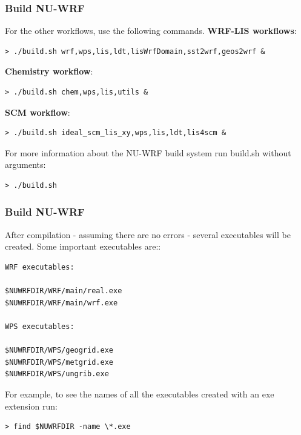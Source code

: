 \begin{frame}[fragile]\frametitle{Build NU-WRF}

\scriptsize{
For the other workflows, use the following commands.
\bigbreak
\textbf{WRF-LIS workflows}:
\begin{lstlisting}
> ./build.sh wrf,wps,lis,ldt,lisWrfDomain,sst2wrf,geos2wrf &
\end{lstlisting}
\textbf{Chemistry workflow}:
\begin{lstlisting}
> ./build.sh chem,wps,lis,utils &
\end{lstlisting}
\textbf{SCM workflow}:
\begin{lstlisting}
> ./build.sh ideal_scm_lis_xy,wps,lis,ldt,lis4scm &
\end{lstlisting}
For more information about the NU-WRF build system run build.sh without arguments:
\begin{lstlisting}
> ./build.sh
\end{lstlisting}
}
\end{frame}


\begin{frame}[fragile]\frametitle{Build NU-WRF}

After compilation - assuming there are no errors - several executables will be created. Some important executables are::
\begin{lstlisting}
WRF executables:

$NUWRFDIR/WRF/main/real.exe
$NUWRFDIR/WRF/main/wrf.exe

WPS executables:

$NUWRFDIR/WPS/geogrid.exe
$NUWRFDIR/WPS/metgrid.exe
$NUWRFDIR/WPS/ungrib.exe

\end{lstlisting}
For example, to see the names of all the executables created with an exe extension run:
\begin{lstlisting}
> find $NUWRFDIR -name \*.exe
\end{lstlisting}

\end{frame}


